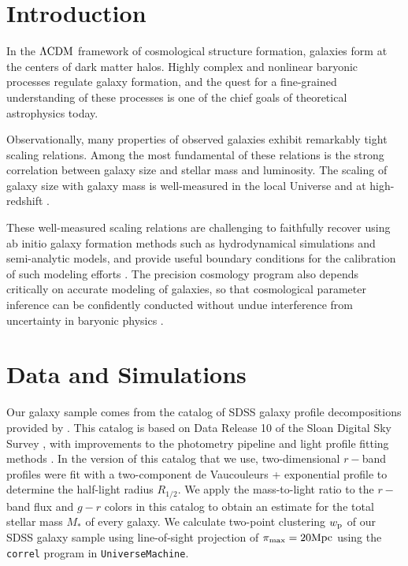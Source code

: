 \documentclass[usenatbib,usegraphicx,letterpaper]{mn2e}
\newcommand{\rhalf}{R_{1/2}}
\newcommand{\mstar}{M_{\ast}}
\newcommand{\lcdm}{\Lambda{\rm CDM}}
\newcommand{\wproj}{w_{\rm p}}
\newcommand{\mpc}{{\rm Mpc}}
\begin{document}
\section{Introduction}
\label{sec:intro}

In the $\lcdm$ framework of cosmological structure formation, galaxies form at the centers of dark matter halos. Highly complex and nonlinear baryonic processes regulate galaxy formation, and the quest for a fine-grained understanding of these processes is one of the chief goals of theoretical astrophysics today. 

Observationally, many properties of observed galaxies exhibit remarkably tight scaling relations. Among the most fundamental of these relations is the strong correlation between galaxy size and stellar mass and luminosity. The scaling of galaxy size with galaxy mass is well-measured in the local Universe \citep{shen_etal03,guo_etal09,huang_etal13,zhang_yang17} and at high-redshift \citep{trujillo_etal04,vanderwel_etal14,kawamata_etal15,shibuya_etal15,huertas_company_etal13a,lange_etal15,huang_etal17}.

These well-measured scaling relations are challenging to faithfully recover using ab initio galaxy formation methods such as hydrodynamical simulations and semi-analytic models, and provide useful boundary conditions for the calibration of such modeling efforts \citep{khochfar_silk06,dutton_etal10,hopkins_etal10a,bottrell_etal17b}. The precision cosmology program also depends critically on accurate modeling of galaxies, so that cosmological parameter inference can be confidently conducted without undue interference from uncertainty in baryonic physics \citep{LSST_science,LSST_galaxies}. 



\section{Data and Simulations}
\label{sec:data}

Our galaxy sample comes from the catalog of SDSS galaxy profile decompositions provided by \citet{meert_etal15}. This catalog is based on Data Release 10 of the Sloan Digital Sky Survey \citep[SDSS,][]{ahn_etal14}, with improvements to the photometry pipeline and light profile fitting methods \citep{vikram_etal10,bernardi_etal13,bernardi_etal14,meert_etal13}. In the version of this catalog that we use, two-dimensional $r-$band profiles were fit with a two-component de Vaucouleurs + exponential profile to determine the half-light radius $\rhalf.$ We apply the \citet{bell_etal03} mass-to-light ratio to the $r-$band flux and $g-r$ colors in this catalog to obtain an estimate for the total stellar mass $\mstar$ of every galaxy. We calculate two-point clustering $\wproj$ of our SDSS galaxy sample using line-of-sight projection of $\pi_{\rm max}=20\mpc$ using the {\tt correl} program in {\tt UniverseMachine}.
\end{document}
